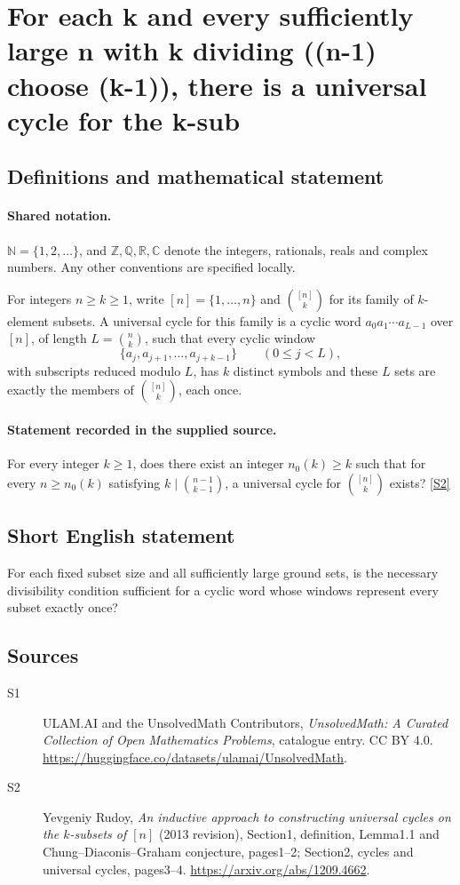 \documentclass[11pt]{article}
\newcommand{\sref}[2]{\hyperlink{source:#1:#2}{[S#2]}}
\begin{document}
\section{For each k and every sufficiently large n with k dividing ((n-1) choose (k-1)), there is a universal cycle for the k-sub}\label{statement}

\subsection{Definitions and mathematical statement}

\paragraph{Shared notation.}$\mathbb N=\{1,2,\ldots\}$, and $\mathbb Z,\mathbb Q,\mathbb R,\mathbb C$ denote the integers, rationals, reals and complex numbers. Any other conventions are specified locally.


For integers $n\ge k\ge1$, write $[n]=\{1,\ldots,n\}$ and $\binom{[n]}k$ for its family of $k$-element subsets. A universal cycle for this family is a cyclic word $a_0a_1\cdots a_{L-1}$ over $[n]$, of length $L=\binom nk$, such that every cyclic window
\[\{a_j,a_{j+1},\ldots,a_{j+k-1}\}\qquad(0\le j<L),\]
with subscripts reduced modulo $L$, has $k$ distinct symbols and these $L$ sets are exactly the members of $\binom{[n]}k$, each once.

\paragraph{Statement recorded in the supplied source.}
For every integer $k\ge1$, does there exist an integer $n_0(k)\ge k$ such that for every $n\ge n_0(k)$ satisfying $k\mid\binom{n-1}{k-1}$, a universal cycle for $\binom{[n]}k$ exists? \sref{statement}{2}

\subsection{Short English statement}
For each fixed subset size and all sufficiently large ground sets, is the necessary divisibility condition sufficient for a cyclic word whose windows represent every subset exactly once?
\subsection{Sources}
\begin{description}
\item[\hypertarget{source:statement:1}{S1}] ULAM.AI and the UnsolvedMath Contributors, \emph{UnsolvedMath: A Curated Collection of Open Mathematics Problems}, catalogue entry. CC BY 4.0. \url{https://huggingface.co/datasets/ulamai/UnsolvedMath}.
\item[\hypertarget{source:statement:2}{S2}] Yevgeniy Rudoy, \emph{An inductive approach to constructing universal cycles on the $k$-subsets of $[n]$} (2013 revision), Section1, definition, Lemma1.1 and Chung--Diaconis--Graham conjecture, pages1--2; Section2, cycles and universal cycles, pages3--4. \url{https://arxiv.org/abs/1209.4662}.
\end{description}
\label{end:statement}
\end{document}
